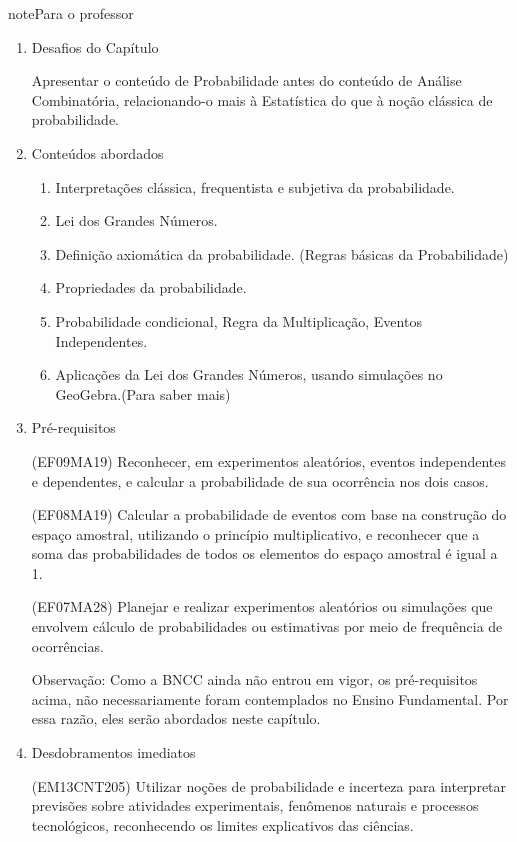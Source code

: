 \begin{sphinxadmonition}{note}{Para o professor}
\begin{enumerate}
\item {} 
Desafios do Capítulo

Apresentar o conteúdo de Probabilidade antes do conteúdo de Análise Combinatória, relacionando-o mais à Estatística do que à noção clássica de probabilidade.

\item {} 
Conteúdos abordados
\begin{enumerate}
\item {} 
Interpretações clássica, frequentista e subjetiva da probabilidade.

\item {} 
Lei dos Grandes Números.

\item {} 
Definição axiomática da probabilidade. (Regras básicas da Probabilidade)

\item {} 
Propriedades da probabilidade.

\item {} 
Probabilidade condicional, Regra da Multiplicação, Eventos Independentes.

\item {} 
Aplicações da Lei dos Grandes Números, usando simulações no GeoGebra.(Para saber mais)

\end{enumerate}

\item {} 
Pré-requisitos

(EF09MA19) Reconhecer, em experimentos aleatórios, eventos independentes e dependentes, e calcular a probabilidade de sua ocorrência nos dois casos.

(EF08MA19) Calcular a probabilidade de eventos com base na construção do espaço amostral, utilizando o princípio multiplicativo, e reconhecer que a soma das probabilidades de todos os elementos do espaço amostral é igual a 1.

(EF07MA28) Planejar e realizar experimentos aleatórios ou simulações que envolvem cálculo de probabilidades ou estimativas por meio de frequência de ocorrências.

Observação: Como a BNCC ainda não entrou em vigor, os pré-requisitos acima, não necessariamente foram contemplados no Ensino Fundamental. Por essa razão, eles serão abordados neste capítulo.

\item {} 
Desdobramentos imediatos

(EM13CNT205) Utilizar noções de probabilidade e incerteza para interpretar previsões sobre atividades experimentais, fenômenos naturais e processos tecnológicos, reconhecendo os limites explicativos das ciências.


\end{enumerate}
\end{sphinxadmonition}
